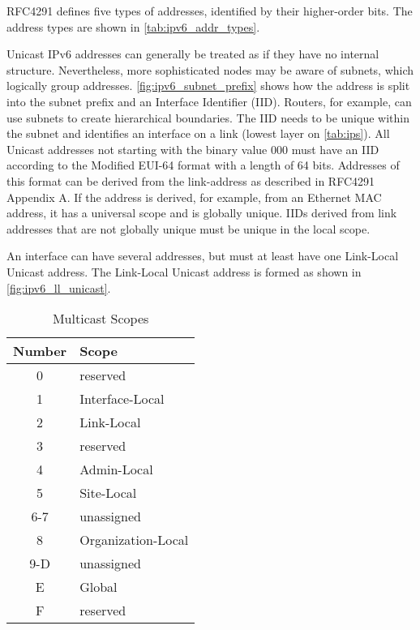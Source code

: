 RFC4291 \cite{rfc4291} defines five types of addresses, identified by their higher-order bits.
The address types are shown in \autoref{tab:ipv6_addr_types}.



Unicast IPv6 addresses can generally be treated as if they have no internal structure.
Nevertheless, more sophisticated nodes may be aware of subnets, which logically group addresses.
\autoref{fig:ipv6_subnet_prefix} shows how the address is split into the subnet prefix and an Interface Identifier (IID).
Routers, for example, can use subnets to create hierarchical boundaries.
The IID needs to be unique within the subnet and identifies an interface on a link (lowest layer on \autoref{tab:ips}).
All Unicast addresses not starting with the binary value 000 must have an IID according to the Modified EUI-64 format with a length of 64 bits.
Addresses of this format can be derived from the link-address as described in RFC4291 \cite{rfc4291} Appendix A.
If the address is derived, for example, from an Ethernet MAC address, it has a universal scope and is globally unique.
IIDs derived from link addresses that are not globally unique must be unique in the local scope.



An interface can have several addresses, but must at least have one Link-Local Unicast address.
The Link-Local Unicast address is formed as shown in \autoref{fig:ipv6_ll_unicast}.



\begin{table}
	\centering
	\caption{Multicast Scopes}
	\begin{tabular}{|c|l|} \hline
	Number & Scope              \\ \hline \hline
	0      & reserved           \\ \hline
	1      & Interface-Local    \\ \hline
	2      & Link-Local         \\ \hline
	3      & reserved           \\ \hline
	4      & Admin-Local        \\ \hline
	5      & Site-Local         \\ \hline
	6-7    & unassigned         \\ \hline
	8      & Organization-Local \\ \hline
	9-D    & unassigned         \\ \hline
	E      & Global             \\ \hline
	F      & reserved           \\ \hline
	\end{tabular}
	\label{tab:mcast_scopes}
\end{table}

